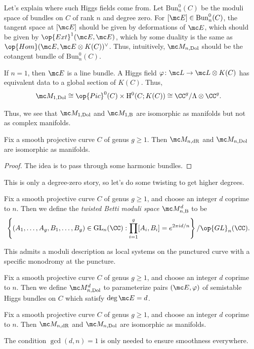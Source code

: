 \documentclass{article}
\begin{document}
\begin{remark}
	Let's explain where such Higgs fields come from. Let $\mathrm{Bun}_n^0(C)$ be the moduli space of bundles on $C$ of rank $n$ and degree zero. For $[\mc E]\in\mathrm{Bun}_n^0(C)$, the tangent space at $[\mc E]$ should be given by deformations of $\mc E$, which should be given by $\op{Ext}^1(\mc E,\mc E)$, which by some duality is the same as $\op{Hom}(\mc E,\mc E\otimes K(C))^\lor$. Thus, intuitively, $\mc M_{n,\mathrm{Dol}}$ should be the cotangent bundle of $\mathrm{Bun}_n^0(C)$.
\end{remark}
\begin{example}
	If $n=1$, then $\mc E$ is a line bundle. A Higgs field $\varphi\colon\mc L\to\mc L\otimes K(C)$ has equivalent data to a global section of $K(C)$. Thus,
	\[\mc M_{1,\mathrm{Dol}}\cong\op{Pic}^0(C)\times\mathrm H^0(C;K(C))\cong\CC^g/\Lambda\otimes\CC^g.\]
\end{example}
Thus, we see that $\mc M_{1,\mathrm{Dol}}$ and $\mc M_{1,\mathrm B}$ are isomorphic as manifolds but not as complex manifolds.
\begin{theorem}
	Fix a smooth projective curve $C$ of genus $g\ge1$. Then $\mc M_{n,\mathrm{dR}}$ and $\mc M_{n,\mathrm{Dol}}$ are isomorphic as manifolds.
\end{theorem}
\begin{proof}
	The idea is to pass through some harmonic bundles.
\end{proof}
This is only a degree-zero story, so let's do some twisting to get higher degrees.
\begin{definition}
	Fix a smooth projective curve $C$ of genus $g\ge1$, and choose an integer $d$ coprime to $n$. Then we define the \textit{twisted Betti moduli space} $\mc M_{n,\mathrm B}^d$ to be
	\[\left\{(A_1,\ldots,A_g,B_1,\ldots,B_g)\in\operatorname{GL}_n(\CC):\prod_{i=1}^g[A_i,B_i]=e^{2\pi id/n}\right\}/\op{GL}_n(\CC).\]
\end{definition}
\begin{remark}
	This admits a moduli description as local systems on the punctured curve with a specific monodromy at the puncture.
\end{remark}
\begin{definition}
	Fix a smooth projective curve $C$ of genus $g\ge1$, and choose an integer $d$ coprime to $n$. Then we define $\mc M_{n,\mathrm{Dol}}^d$ to parameterize pairs $(\mc E,\varphi)$ of semistable Higgs bundles on $C$ which satisfy $\deg\mc E=d$.
\end{definition}
\begin{theorem}
	Fix a smooth projective curve $C$ of genus $g\ge1$, and choose an integer $d$ coprime to $n$. Then $\mc M_{n,\mathrm{dR}}$ and $\mc M_{n,\mathrm{Dol}}$ are isomorphic as manifolds.
\end{theorem}
\begin{remark}
	The condition $\gcd(d,n)=1$ is only needed to ensure smoothness everywhere.
\end{remark}
\end{document}
